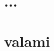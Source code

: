 \documentclass[12pt,a4paper]{report}
\begin{document}
\chapter{...}






\appendix

\chapter{valami}
\end{document}
